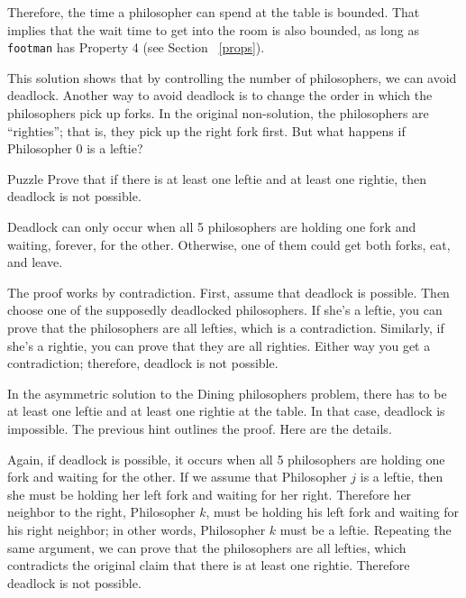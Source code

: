 Therefore, the time a philosopher can spend at the table is bounded.
That implies that the wait time to get into the room is also bounded,
as long as {\tt footman} has Property 4 (see Section ~\ref{props}).

This solution shows that
by controlling the number of philosophers, we can avoid deadlock.
Another way to avoid deadlock is to change the order in which the
philosophers pick up forks.  In the original non-solution, the
philosophers are ``righties''; that is, they pick up the right fork
first.  But what happens if Philosopher 0 is a leftie?

\begin{puzzlebox}{Puzzle}
Prove that if there is at least one leftie and at least one
rightie, then deadlock is not possible.

Deadlock can only occur when all 5 philosophers are holding
one fork and waiting, forever, for the other.  Otherwise, one of
them could get both forks, eat, and leave.

\vspace{1em}
The proof works by contradiction.  First, assume that deadlock is
possible.  Then choose one of the supposedly deadlocked philosophers.
If she's a leftie, you can prove that the philosophers are all
lefties, which is a contradiction.  Similarly, if she's a rightie, you
can prove that they are all righties.  Either way you get a
contradiction; therefore, deadlock is not possible.
\end{puzzlebox}



In the asymmetric solution to the Dining philosophers problem,
there has to be at least one leftie and at least one rightie at
the table.  In that case, deadlock is impossible.  The previous
hint outlines the proof.  Here are the details.

Again, if deadlock is possible, it occurs when all 5 philosophers
are holding one fork and waiting for the other.  If we assume that
Philosopher $j$ is a leftie, then she must be holding her left
fork and waiting for her right.  Therefore her neighbor to the right,
Philosopher $k$, must be holding his left fork and waiting for
his right neighbor; in other words, Philosopher $k$ must be a leftie.
Repeating the same argument, we can prove that the philosophers
are all lefties, which contradicts the original claim that there
is at least one rightie.  Therefore deadlock is not possible.

